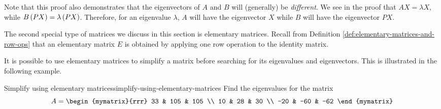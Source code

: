 Note that this proof also demonstrates that the eigenvectors of $A$ and $B$ will (generally) be {\em different\em}.
We see in the proof that $AX = \lambda X$, while $B \left(PX\right)=\lambda \left(PX\right)$. Therefore,
for an eigenvalue $\lambda$, $A$ will have the eigenvector $X$ while $B$ will have the eigenvector $PX$. 


The second special type of matrices we discuss in this section is elementary matrices.  
Recall from Definition \ref{def:elementary-matrices-and-row-ops} that an elementary matrix $E$ is obtained by applying
one row operation to the identity matrix. 

It is possible to use elementary matrices to simplify a matrix before searching for its
eigenvalues and eigenvectors. This is illustrated in the following
example.

\begin{example}{Simplify using elementary matrices}{simplify-using-elementary-matrices}
Find the eigenvalues for the matrix
\begin{equation*}
A = \begin{mymatrix}{rrr}
 33 & 105 & 105 \\
 10 &  28 & 30 \\
-20 & -60 & -62
\end{mymatrix}
\end{equation*}
\end{example}

